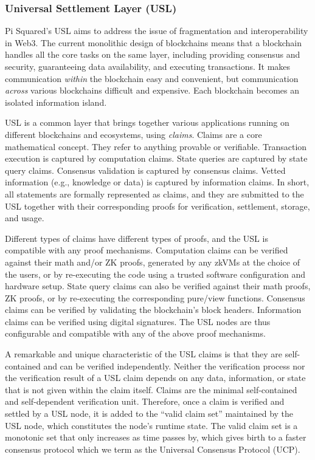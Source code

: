 \documentclass{article}
\begin{document}
\subsubsection{Universal Settlement Layer (USL)} 

Pi Squared's USL aims to address the issue of fragmentation and interoperability 
in Web3.
The current monolithic design of blockchains means that a blockchain handles
all the core tasks on the same layer, including
providing consensus and security, 
guaranteeing data availability, and executing transactions.
It makes communication \emph{within} the blockchain easy and convenient,
but communication \emph{across} various blockchains difficult and expensive. 
Each blockchain becomes an isolated information island. 

USL is a common layer that brings together various applications running on different blockchains and ecosystems,
using \emph{claims}. 
Claims are a core mathematical concept.
They refer to anything provable or verifiable. 
Transaction execution is captured by computation claims. 
State queries are captured by state query claims. 
Consensus validation is captured by consensus claims. 
Vetted information (e.g., knowledge or data) is captured by information claims. 
In short, all statements are formally represented as claims, and they are submitted to the USL
together with their corresponding proofs for verification, settlement, storage, and usage. 

Different types of claims have different types of proofs, and the USL is compatible
with any proof mechanisms. 
Computation claims can be verified against their math and/or ZK proofs, generated by any zkVMs at the choice of the users, or by re-executing the code 
using a trusted software configuration and hardware setup. 
State query claims can also be verified against their math proofs, ZK proofs, or by re-executing the corresponding pure/view functions.
Consensus claims can be verified by validating the blockchain's block headers. 
Information claims can be verified using digital signatures. 
The USL nodes are thus configurable and compatible with any of the above proof mechanisms. 

A remarkable and unique characteristic of the USL claims 
is that they are self-contained and can be verified independently. 
Neither the verification process nor the verification result of a USL claim depends on
any data, information, or state that is not given within the claim itself. 
Claims are the minimal self-contained and self-dependent verification unit. 
Therefore, once a claim is verified and settled by a USL node, it is added
to the ``valid claim set'' maintained by the USL node, which constitutes the node's runtime state. 
The valid claim set is a monotonic set that only increases as time passes by,
which gives birth to a faster consensus protocol which we term as the Universal Consensus Protocol (UCP). 
\end{document}
